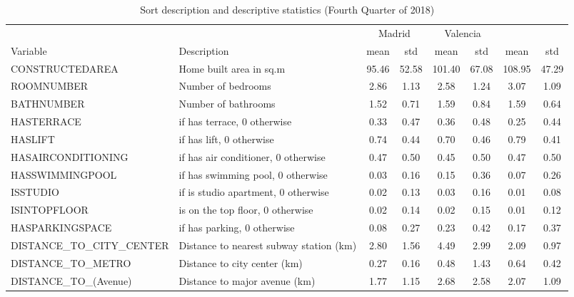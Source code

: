 \documentclass[Royal,times,sageh]{sagej}
\begin{document}
\begin{table}[ht]
\centering
\fontsize{6}{8}\selectfont
\begin{tabular}{>{\raggedright\arraybackslash}p{12em}>{\raggedright\arraybackslash}p{16em}cccccc}
  \toprule
\multicolumn{2}{c}{ } & \multicolumn{2}{c}{ Barcelona} & \multicolumn{2}{c}{Madrid} & \multicolumn{2}{c}{Valencia} \\
\cmidrule(l{3pt}r{3pt}){3-4} \cmidrule(l{3pt}r{3pt}){5-6} \cmidrule(l{3pt}r{3pt}){7-8}
Variable & Description & mean & std & mean & std & mean & std \\ 
  \midrule
CONSTRUCTEDAREA & Home built area in sq.m & 95.46 & 52.58 & 101.40 & 67.08 & 108.95 & 47.29 \\ 
  ROOMNUMBER & Number of bedrooms & 2.86 & 1.13 & 2.58 & 1.24 & 3.07 & 1.09 \\ 
  BATHNUMBER & Number of bathrooms & 1.52 & 0.71 & 1.59 & 0.84 & 1.59 & 0.64 \\ 
  HASTERRACE & =1 if has terrace, 0 otherwise & 0.33 & 0.47 & 0.36 & 0.48 & 0.25 & 0.44 \\ 
  HASLIFT & =1 if has lift, 0 otherwise & 0.74 & 0.44 & 0.70 & 0.46 & 0.79 & 0.41 \\ 
  HASAIRCONDITIONING & =1 if has air conditioner, 0 otherwise & 0.47 & 0.50 & 0.45 & 0.50 & 0.47 & 0.50 \\ 
  HASSWIMMINGPOOL & =1 if has swimming pool, 0 otherwise & 0.03 & 0.16 & 0.15 & 0.36 & 0.07 & 0.26 \\ 
  ISSTUDIO & =1 if is studio apartment, 0 otherwise & 0.02 & 0.13 & 0.03 & 0.16 & 0.01 & 0.08 \\ 
  ISINTOPFLOOR & =1 is on the top floor, 0 otherwise & 0.02 & 0.14 & 0.02 & 0.15 & 0.01 & 0.12 \\ 
  HASPARKINGSPACE & =1 if has parking, 0 otherwise & 0.08 & 0.27 & 0.23 & 0.42 & 0.17 & 0.37 \\ 
  DISTANCE\_TO\_CITY\_CENTER & Distance to nearest subway station (km) & 2.80 & 1.56 & 4.49 & 2.99 & 2.09 & 0.97 \\ 
  DISTANCE\_TO\_METRO & Distance to city center (km) & 0.27 & 0.16 & 0.48 & 1.43 & 0.64 & 0.42 \\ 
  DISTANCE\_TO\_(Avenue) & Distance to major avenue (km) & 1.77 & 1.15 & 2.68 & 2.58 & 2.07 & 1.09 \\ 
   \bottomrule
\end{tabular}
\caption{Sort description and descriptive statistics (Fourth Quarter of 2018)\label{tab:descriptives}} 
\end{table}
\end{document}

